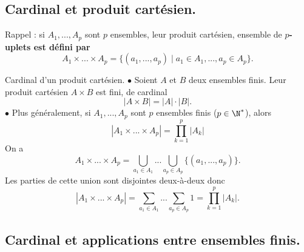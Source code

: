 \documentclass[11pt]{article}
\begin{document}
\subsection{Cardinal et produit cartésien.}
Rappel : si $A_1,...,A_p$ sont $p$ ensembles, leur produit cartésien, ensemble de $p$\bf{-uplets} est défini par
\begin{equation*}
    A_1\times ...\times A_p=\{(a_1,...,a_p)\mid a_1\in A_1,...,a_p\in A_p\}.
\end{equation*}

\begin{prop}{Cardinal d'un produit cartésien.}{}
    $\bullet$ Soient $A$ et $B$ deux ensembles finis. Leur produit cartésien $A\times B$ est fini, de cardinal
    \begin{equation*}
        |A\times B|=|A|\cdot|B|.
    \end{equation*}
    $\bullet$ Plus généralement, si $A_1,...,A_p$ sont $p$ ensembles finis ($p\in\N^*$), alors
    \begin{equation*}
        |A_1\times...\times A_p|=\prod_{k=1}^p|A_k|
    \end{equation*}
    \tcblower
    On a
    \begin{equation*}
        A_1\times...\times A_p=\bigcup_{a_1\in A_1}...\bigcup_{a_p\in A_p}\{(a_1,...,a_p)\}.
    \end{equation*}
    Les parties de cette union sont disjointes deux-à-deux donc
    \begin{equation*}
        |A_1\times...\times A_p|=\sum_{a_1\in A_1}...\sum_{a_p\in A_p}1=\prod_{k=1}^p|A_k|.
    \end{equation*}
\end{prop}

\subsection{Cardinal et applications entre ensembles finis.}
\end{document}
